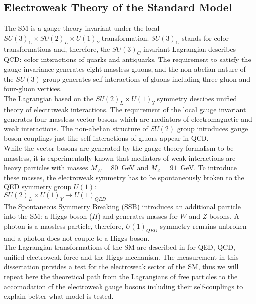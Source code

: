 \subsection{Electroweak Theory of the Standard Model}
\label{sec:WgAbout_SMEWK}


The SM is a gauge theory invariant under the local $SU(3)_C \times SU(2)_L \times U(1)_Y$ transformation. $SU(3)_C$ stands for color transformations and, therefore, the $SU(3)_C$-invariant Lagrangian describes QCD: color interactions of quarks and antiquarks. The requirement to satisfy the gauge invariance generates eight massless gluons, and the non-abelian nature of the $SU(3)$ group generates self-interactions of gluons including three-gluon and four-gluon vertices.\\

The Lagrangian based on the $SU(2)_L \times U(1)_Y$ symmetry descibes unified theory of electroweak interactions. The requirement of the local gauge invariant generates four massless vector bosons which are mediators of electromagnetic and weak interactions. The non-abelian structure of $SU(2)$ group introduces gauge boson couplings just like self-interactions of gluons appear in QCD.\\ 

While the vector bosons are generated by the gauge theory formalism to be massless, it is experimentally known that mediators of weak interactions are heavy particles with masses $M_W=80$~GeV and $M_Z=91$~GeV. To introduce these masses, the electroweak symmetry has to be spontaneously broken to the QED symmetry group $U(1)$:\\

$SU(2)_L \times U(1)_Y \rightarrow U(1)_{QED}$\\

The Spontaneous Symmetry Breaking (SSB) introduces an additional particle into the SM: a Higgs boson ($H$) and generates masses for $W$ and $Z$ bosons. A photon is a massless particle, therefore, $U(1)_{QED}$ symmetry remains unbroken and a photon does not couple to a Higgs boson.\\

The Lagrangian transformations of the SM are described in \cite{ref_Pich} for QED, QCD, unified electroweak force and the Higgs mechanism. The measurement in this dissertation provides a test for the electroweak sector of the SM, thus we will repeat here the theoretical path from the Lagrangians of free particles to the accomodation of the electroweak gauge bosons including their self-couplings to explain better what model is tested.\\

